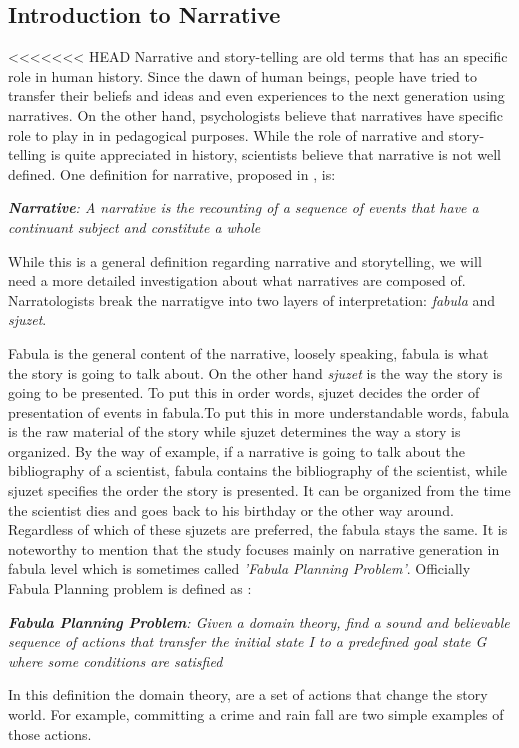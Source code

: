 \documentclass[english]{tktltiki}
\begin{document}
\subsection{Introduction to Narrative}
<<<<<<< HEAD
Narrative and story-telling are old terms that has an specific role in human history. Since the dawn of human beings, people have tried to transfer their beliefs and ideas and even experiences to the next generation using narratives. On the other hand, psychologists believe that narratives have specific role to play in in pedagogical purposes. While the role of narrative and story-telling is quite appreciated in history, scientists believe that narrative is not well defined. One definition for narrative, proposed in \cite{planning:2010:NPB:1946417.1946422}, is:
\begin{flushleft}
\textit{\textbf{Narrative}: A narrative is the recounting of a sequence of events that have a continuant subject and constitute a whole } 
\end{flushleft}

While this is a general definition regarding narrative and storytelling, we will need a more detailed investigation about what narratives are composed of. Narratologists break the narratigve into two layers of interpretation: \textit{fabula} and \textit{sjuzet}. 

Fabula is the general content of the narrative, loosely speaking, fabula is what the story is going to talk about. On the other hand \textit{sjuzet} is the way the story is going to be presented. To put this in order words, sjuzet decides the order of presentation of events in fabula.To put this in more understandable words, fabula is the raw material of the story while sjuzet determines the way a story is organized. By the way of example, if a narrative is going to talk about the bibliography of a scientist, fabula contains the bibliography of the scientist, while sjuzet specifies the order the story is presented. It can be organized from the time the scientist dies and goes back to his birthday or the other way around. Regardless of which of these sjuzets are preferred, the fabula stays the same. \newline
It is noteworthy to mention that the study focuses mainly on narrative generation in fabula level which is sometimes called \textit{'Fabula Planning Problem'}. Officially Fabula Planning problem is defined as \cite{planning:2010:NPB:1946417.1946422}: 
\begin{flushleft}
\textit{\textbf{Fabula Planning Problem}: Given a domain theory, find a sound and believable sequence of actions that transfer the initial state \textit{I} to a predefined goal state \textit{G} where some conditions are satisfied }
\end{flushleft}
In this definition the domain theory, are a set of actions that change the story world. For example, committing a crime and rain fall are two simple examples of those actions. 
\end{document}

